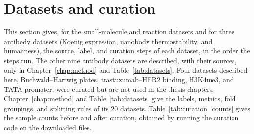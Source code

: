 
\section{Datasets and curation}\label{app:datasets}


This section gives, for the small-molecule and reaction datasets and for three antibody datasets (Koenig expression, nanobody thermostability, and humanness), the source, label, and curation steps of each dataset, in the order the steps run. The other nine antibody datasets are described, with their sources, only in Chapter~\ref{chap:method} and Table~\ref{tab:datasets}. Four datasets described here, Buchwald--Hartwig plates, trastuzumab--HER2 binding, H3K4me3, and TATA promoter, were curated but are not used in the thesis chapters. Chapter~\ref{chap:method} and Table~\ref{tab:datasets} give the labels, metrics, fold groupings, and splitting rules of its 20 datasets. Table~\ref{tab:curation_counts} gives the sample counts before and after curation, obtained by running the curation code on the downloaded files.


